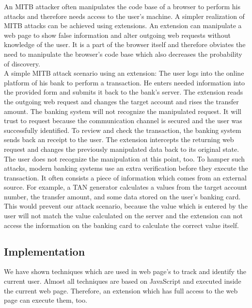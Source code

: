 			An MITB attacker often manipulates the code base of a browser to perform his attacks and therefore needs access to the user's machine. A simpler realization of MITB attacks can be achieved using extensions. An extension can manipulate a web page to show false information and alter outgoing web requests without knowledge of the user. It is a part of the browser itself and therefore obviates the need to manipulate the browser's code base which also decreases the probability of discovery. \\
			
			A simple MITB attack scenario using an extension: The user logs into the online platform of his bank to perform a transaction. He enters needed information into the provided form and submits it back to the bank's server. The extension reads the outgoing web request and changes the target account and rises the transfer amount. The banking system will not recognize the manipulated request. It will trust to request because the communication channel is secured and the user was successfully identified. To review and check the transaction, the banking system sends back an receipt to the user. The extension intercepts the returning web request and changes the previously manipulated data back to its original state. The user does not recognize the manipulation at this point, too. To hamper such attacks, modern banking systems use an extra verification before they execute the transaction. It often consists a piece of information which comes from an external source. For example, a TAN generator calculates a values from the target account number, the transfer amount, and some data stored on the user's banking card. This would prevent our attack scenario, because the value which is entered by the user will not match the value calculated on the server and the extension can not access the information on the banking card to calculate the correct value itself. \\
	 
	\subsection{Implementation}

		We have shown techniques which are used in web page's to track and identify the current user. Almost all techniques are based on JavaScript and executed inside the current web page. Therefore, an extension which has full access to the web page can execute them, too. \\
		
